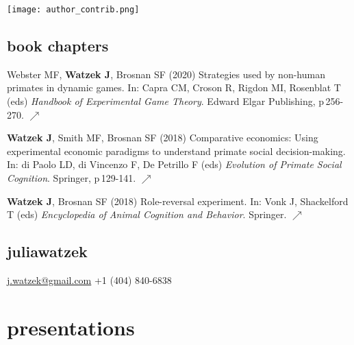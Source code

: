 \documentclass[]{friggeri-cv}
\begin{document}
\texttt{[image: author\_contrib.png]}\\[.7cm] %


\subsection{book chapters}

\begin{enumerate}[resume, label={[\,\arabic*\,]}]
  \item Webster MF, \textbf{Watzek J}, Brosnan SF (2020) Strategies used by non-human primates in dynamic games. In: Capra CM, Croson R, Rigdon MI, Rosenblat T (eds) \emph{Handbook of Experimental Game Theory}. Edward Elgar Publishing, p\,256-270. \href{https://doi.org/10.4337/9781785363337.00018}{\small $\nearrow$}
  \item \textbf{Watzek J}, Smith MF, Brosnan SF (2018) Comparative economics: Using experimental economic paradigms to understand primate social decision-making. In: di Paolo LD, di Vincenzo F, De Petrillo F (eds) \emph{Evolution of Primate Social Cognition}. Springer, p\,129-141. \href{https://doi.org/10.1007/978-3-319-93776-2_9}{\small $\nearrow$}
  \item \textbf{Watzek J}, Brosnan SF (2018) Role-reversal experiment. In: Vonk J, Shackelford T (eds) \emph{Encyclopedia of Animal Cognition and Behavior}. Springer. \href{https://doi.org/10.1007/978-3-319-47829-6_1497-1}{\small $\nearrow$}
\end{enumerate}



\begin{aside}
  \section{{\normalfont julia}watzek}
    \href{mailto:j.watzek@gmail.com}{j.watzek@gmail.com}
    +1 (404) 840-6838
\end{aside}


\section{presentations}
\end{document}
